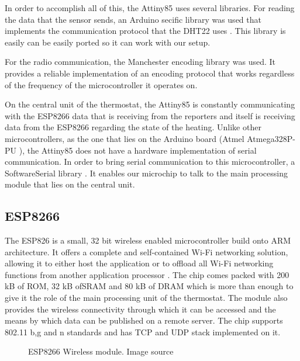 In order to accomplish all of this, the Attiny85 uses several libraries.
For reading the data that the sensor sends, an Arduino secific library was used that implements the
communication protocol that the DHT22 uses \cite{website:dht22_library}. This library is easily can be easily
ported so it can work with our setup.

For the radio communication, the Manchester encoding library \cite{website:manchester} was used. It provides
a reliable implementation of an encoding protocol that works regardless of the frequency of the
microcontroller it operates on.

\qquad On the central unit of the thermostat, the Attiny85 is constantly communicating with the ESP8266 data that is
receiving from the reporters and itself is receiving data from the ESP8266 regarding the state of the heating.
Unlike other microcontrollers, as the one that lies on the Arduino board (Atmel Atmega328P-PU
\cite{datasheet:atmega328}), the Attiny85 does not have a hardware implementation of serial communication. In
order to bring serial communication to this microcontroller, a SoftwareSerial library
\cite{website:softserial}. It enables our microchip to talk to the main processing module that lies on the
central unit.


\subsection{ESP8266}
\label{sec:esp8266}

\qquad The ESP826 is a small, 32 bit wireless enabled microcontroller build onto ARM architecture. It offers a
complete and self-contained Wi-Fi networking solution, allowing it to either host the application or to
offload all Wi-Fi networking functions from another application processor \cite{website:espressifdesc}.
The chip comes packed with 200 kB of ROM, 32 kB ofSRAM and 80 kB of DRAM which is more than enough to give it
the role of the main processing unit of the thermostat. The module also provides the wireless connectivity
through which it can be accessed and the means by which data can be published on a remote server. The chip
supports 802.11 b,g and n standards and has TCP and UDP stack implemented on it.

\begin{figure}[h!]
    \label{fig:esp8266}
    \centerline{}
    \caption[ESP8266 Wireless module]{ESP8266 Wireless module. Image source
                                      \cite{website:esppicture}}
    \label{fig:esp8266}
\end{figure}

